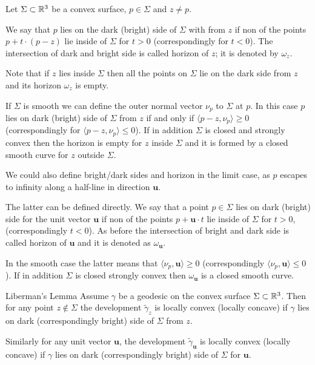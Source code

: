 \documentclass[a4paper,10pt]{amsart}
\begin{document}
Let $\Sigma\subset\mathbb{R}^3$ be a convex surface,
$p\in\Sigma$ and $z\ne p$.

We say that $p$ lies on the dark (bright) side of $\Sigma$ with from $z$ 
if non of the points $p+t\cdot(p-z)$ lie inside of $\Sigma$ for $t>0$ (correspondingly for $t<0$).
The intersection of dark and bright side is called horizon of $z$;
it is denoted by $\omega_z$.

Note that if $z$ lies inside $\Sigma$ 
then all the points on $\Sigma$ lie on the dark side from $z$ and its horizon $\omega_z$ is empty.

If $\Sigma$ is smooth we can define the outer normal vector $\nu_p$ to $\Sigma$ at $p$.
In this case $p$ lies on dark (bright) side of $\Sigma$ from $z$
if and only if $\langle p-z,\nu_p\rangle\ge 0$
(correspondingly for $\langle p-z,\nu_p\rangle\le 0$).
If in addition $\Sigma$ is closed and strongly convex then the horizon is empty for $z$ inside $\Sigma$ 
and it is formed by a closed smooth curve for $z$ outside $\Sigma$.

We could also define bright/dark sides and horizon in the limit case,
as $p$ escapes to infinity along a half-line in direction $\bm{u}$.

The latter can be defined directly.
We say that a point $p\in\Sigma$ lies on dark (bright) side for the unit vector $\bm{u}$ if non of the points $p+\bm{u}\cdot t$ lie inside of $\Sigma$ for $t>0$, (correspondingly $t<0$).
As before the intersection of bright and dark side is called horizon of $\bm{u}$ and it is denoted as $\omega_{\bm{u}}$.

In the smooth case the latter means that $\langle \nu_p,\bm{u}\rangle\ge 0$ (correspondingly $\langle \nu_p,\bm{u}\rangle\le 0$).
If in addition $\Sigma$ is closed strongly convex then $\omega_{\bm{u}}$ is a closed smooth curve.

\begin{thm}{Liberman's Lemma}\label{lem:liberman}
Assume $\gamma$ be a geodesic on the convex surface $\Sigma\subset \mathbb{R}^3$.
Then for any point $z\notin\Sigma$ the development $\tilde\gamma_z$ is locally convex (locally concave) if $\gamma$ lies on dark (correspondingly bright) side of $\Sigma$ from $z$.

Similarly for any unit vector $\bm{u}$,
the development $\tilde\gamma_{\bm{u}}$ is locally convex (locally concave) if $\gamma$ lies on dark (correspondingly bright) side of $\Sigma$ for $\bm{u}$.

\end{thm}
\end{document}

